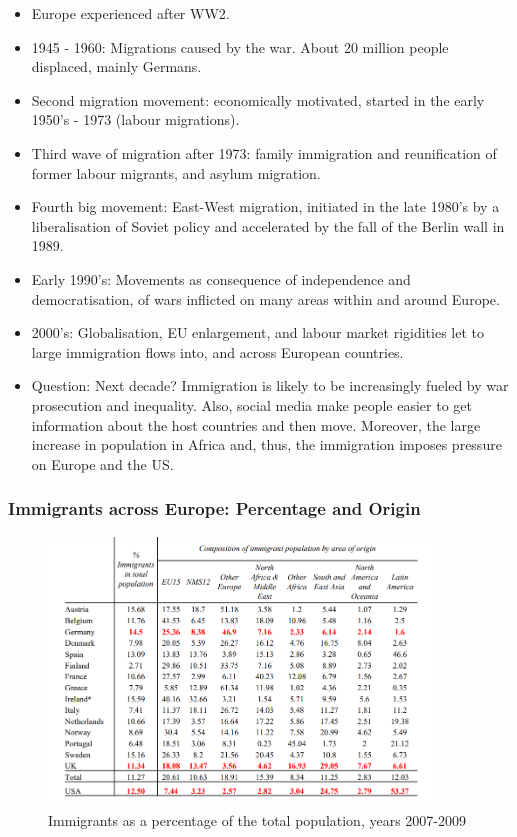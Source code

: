             \begin{itemize}
                \item Europe experienced  after WW2.
                \item 1945 - 1960: Migrations caused by the war. About 20 million people displaced, mainly Germans.
                \item Second migration movement: economically motivated, started in the early 1950's - 1973 (labour migrations).
                \item Third wave of migration after 1973: family immigration and reunification of former labour migrants, and asylum migration.
                \item Fourth big movement: East-West migration, initiated in the late 1980's by a liberalisation of Soviet policy and accelerated by the fall of the Berlin wall in 1989.
                \item Early 1990’s: Movements as consequence of independence and democratisation, of wars inflicted on many areas within and around Europe.
                \item 2000’s: Globalisation, EU enlargement, and labour market rigidities let to large immigration flows into, and across European countries.
                \item Question: Next decade? Immigration is likely to be increasingly fueled by war prosecution and inequality. Also, social media make people easier to get information about the host countries and then move.  Moreover, the large increase in population in Africa and, thus, the immigration imposes pressure on Europe and the US.
            \end{itemize}

        \subsubsection{Immigrants across Europe: Percentage and Origin}

            \begin{figure}[H]
                \centering
                \includegraphics[width=4in]{images/ch11/3.png}
                \caption{Immigrants as a percentage of the total population, years 2007-2009}
            \end{figure}

